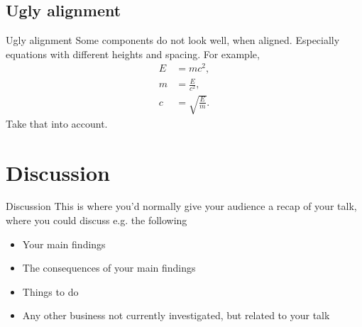 \documentclass{beamer}
\begin{document}
\subsection{Ugly alignment}
\begin{frame}{Ugly alignment}
Some components do not look well, when aligned. Especially equations with different heights and spacing. For example, 
\begin{align}
E&=mc^2,\\
m&=\frac{E}{c^2},\\
c&=\sqrt{\frac{E}{m}}.
\end{align}
Take that into account. 
\end{frame}

\section{Discussion}
\begin{frame}{Discussion}
This is where you'd normally give your audience a recap of your talk, where you could
discuss e.g. the following
\begin{itemize}
\item Your main findings
\item The consequences of your main findings
\item Things to do
\item Any other business not currently investigated, but related to your talk
\end{itemize}
\end{frame}
\end{document}
